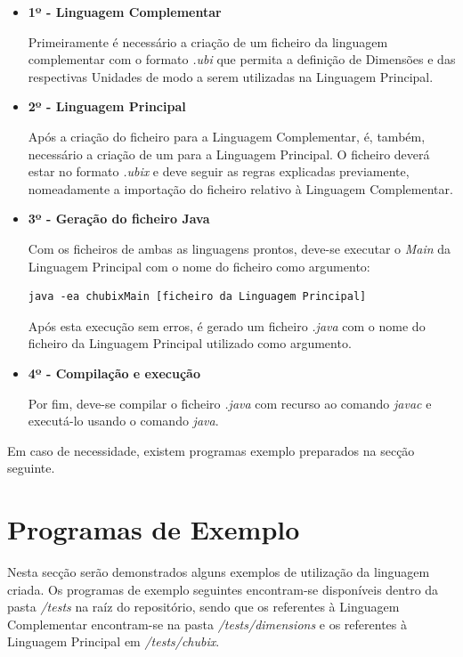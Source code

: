 \documentclass[10pt,portuguese]{article}
\begin{document}
\begin{itemize}
    \item \textbf{1º - Linguagem Complementar}
    \par Primeiramente é necessário a criação de um ficheiro da linguagem complementar com o formato \textit{.ubi} que permita a definição de Dimensões e das respectivas Unidades de modo a serem utilizadas na Linguagem Principal. 
    \item \textbf{2º - Linguagem Principal}
    \par Após a criação do ficheiro para a Linguagem Complementar, é, também, necessário a criação de um para a Linguagem Principal. O ficheiro deverá estar no formato \textit{.ubix} e deve seguir as regras explicadas previamente, nomeadamente a importação do ficheiro relativo à Linguagem Complementar.
    \item \textbf{3º - Geração do ficheiro Java}
    \par Com os ficheiros de ambas as linguagens prontos, deve-se executar o \textit{Main} da Linguagem Principal com o nome do ficheiro como argumento:
    \begin{lstlisting}[numbers=none]
        java -ea chubixMain [ficheiro da Linguagem Principal]
    \end{lstlisting}
    \par Após esta execução sem erros, é gerado um ficheiro \textit{.java} com o nome do ficheiro da Linguagem Principal utilizado como argumento.
    \item \textbf{4º - Compilação e execução}
    \par Por fim, deve-se compilar o ficheiro \textit{.java} com recurso ao comando \textit{javac} e executá-lo usando o comando \textit{java}. 
\end{itemize}

\par Em caso de necessidade, existem programas exemplo preparados na secção seguinte.

\clearpage

\section{Programas de Exemplo}

\par Nesta secção serão demonstrados alguns exemplos de utilização da linguagem criada. Os programas de exemplo seguintes encontram-se disponíveis dentro da pasta \textit{/tests} na raíz do repositório, sendo que os referentes à Linguagem Complementar encontram-se na pasta \textit{/tests/dimensions} e os referentes à Linguagem Principal em \textit{/tests/chubix}.
\end{document}
